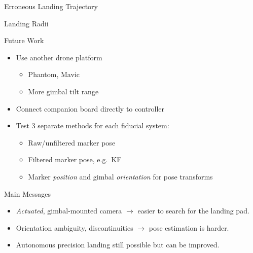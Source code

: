 \documentclass[aspectratio=169]{beamer}
\newif\ifpause
\newcommand{\mypause}{\ifpause \pause \fi}
\begin{document}
\begin{frame}{Erroneous Landing Trajectory}
\end{frame}

\begin{frame}{Landing Radii}
\end{frame}

\begin{frame}{Future Work}
	\begin{itemize}
		\item Use another drone platform
		\begin{itemize}
			\item Phantom, Mavic
			\item More gimbal tilt range
		\end{itemize}
		\item Connect companion board directly to controller
		\item Test 3 separate methods for each fiducial system:
		\begin{itemize}
			\item Raw/unfiltered marker pose
			\item Filtered marker pose, e.g.~KF
			\item Marker \emph{position} and gimbal \emph{orientation} for pose transforms
		\end{itemize}
	\end{itemize}
\end{frame}

\begin{frame}{Main Messages}
	\begin{itemize}
		\item \emph{Actuated}, gimbal-mounted camera
			\mypause $\rightarrow$ easier to search for the landing pad.
		\mypause\item Orientation ambiguity, discontinuities
			\mypause $\rightarrow$ pose estimation is harder.
		\mypause\item Autonomous precision landing still possible
			\mypause but can be improved.
	\end{itemize}
\end{frame}


\end{document}
